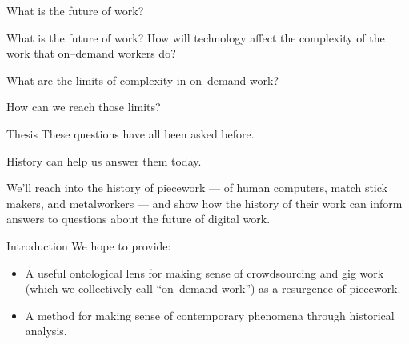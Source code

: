 \documentclass[presentation]{subfiles}
\begin{document}
\begin{frame}[standout]
    What is the future of work?
\end{frame}

\begin{frame}{What is the future of work?}
    How will \alert{technology} affect the complexity of the work that on--demand workers do?

    What are the \alert{limits} of complexity in on--demand work?

    How can we \alert{reach} those limits?
\end{frame}


\begin{frame}{Thesis}
    These questions have all been asked before.

    History can help us answer them today.

    We'll reach into the history of \alert{piecework}
    --- of human computers, match stick makers, and metalworkers ---
    and show how the \alert{history} of their work can
    inform answers to questions about the \alert{future} of digital work.
\end{frame}


\notinsubfile{
}


\begin{frame}{Introduction}
  We hope to provide:
      \begin{itemize}
        \item A useful ontological lens for making sense of crowdsourcing and gig work (which we collectively call ``\alert{on--demand work}'') as a resurgence of \alert{piecework}.
        \item A method for making sense of contemporary phenomena through \alert{historical analysis}.
      \end{itemize}
\end{frame}
\end{document}
